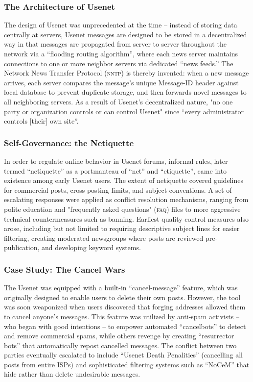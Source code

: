 \subsubsection{The Architecture of Usenet} The design of
Usenet was unprecedented at the time -- instead of storing data centrally at
servers, Usenet messages are designed to be stored in a decentralized way in
that messages are propagated from server to server throughout the network via a
``flooding routing algorithm'', where each news server maintains connections to
one or more neighbor servers via dedicated ``news feeds.'' \cite{HowUseUsenet}
The Network News Transfer Protocol (\textsc{nntp}) is thereby invented: when a
new message arrives, each server compares the message's unique Message-ID header
against local database to prevent duplicate storage, and then forwards novel
messages to all neighboring servers. As a result of Usenet's decentralized
nature, "no one party or organization controls or can control Usenet" since
``every administrator controls [their] own site''.

\subsubsection{Self-Governance: the Netiquette}

In order to regulate online behavior in Usenet forums, informal rules, later
termed ``netiquette'' as a portmanteau of ``net'' and ``etiquette'', came into
existence among early Usenet users.\cite{HowUseUsenet} The extent of netiquette
covered guidelines for commercial posts, cross-posting limits, and subject
conventions. A set of escalating responses were applied as conflict resolution
mechanisms, ranging from polite education and "frequently asked questions"
(\textsc{faq}) files to more aggressive technical countermeasures such as
banning. Earliest quality control measures also arose, including but not limited
to requiring descriptive subject lines for easier filtering, creating moderated
newsgroups where posts are reviewed pre-publication, and developing keyword
systems.

\subsubsection{Case Study: The Cancel Wars}
The Usenet was equipped with a built-in ``cancel-message'' feature, which was
originally designed to enable users to delete their own posts. However, the tool
was soon weaponized when users discovered that forging addresses allowed them to
cancel anyone's messages. This feature was utilized by anti-spam activists --
who began with good intentions -- to empower automated ``cancelbots'' to detect
and remove commercial spams, while others revenge by creating ``resurrector
bots'' that automatically repost cancelled messages. The conflict between two
parties eventually escalated to include ``Usenet Death Penalities'' (cancelling
all posts from entire ISPs) and sophisticated filtering systems such as
``NoCeM'' that hide rather than delete undesirable messages.



